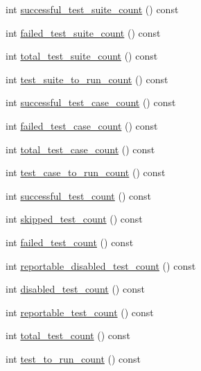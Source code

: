 \begin{DoxyCompactItemize}
\item 
int \hyperlink{classtesting_1_1UnitTest_aefa4c6654fed9a70c6c5ca61abae2234}{successful\+\_\+test\+\_\+suite\+\_\+count} () const
\item 
int \hyperlink{classtesting_1_1UnitTest_a118a74c8cc3845653893ed17245f44ac}{failed\+\_\+test\+\_\+suite\+\_\+count} () const
\item 
int \hyperlink{classtesting_1_1UnitTest_af8ed6d43a95405a860fdd898bf0c1a87}{total\+\_\+test\+\_\+suite\+\_\+count} () const
\item 
int \hyperlink{classtesting_1_1UnitTest_ade4726c8283513bd2b3391c600503790}{test\+\_\+suite\+\_\+to\+\_\+run\+\_\+count} () const
\item 
int \hyperlink{classtesting_1_1UnitTest_acaa2ab71f53c25ffe0242a91c14e173f}{successful\+\_\+test\+\_\+case\+\_\+count} () const
\item 
int \hyperlink{classtesting_1_1UnitTest_abc0fa297a4103f7cdd9627ae27d9d0ef}{failed\+\_\+test\+\_\+case\+\_\+count} () const
\item 
int \hyperlink{classtesting_1_1UnitTest_a93fc8f4eebc3212d06468ad216830ced}{total\+\_\+test\+\_\+case\+\_\+count} () const
\item 
int \hyperlink{classtesting_1_1UnitTest_a965248fbe72f9fede5de921b6666943b}{test\+\_\+case\+\_\+to\+\_\+run\+\_\+count} () const
\item 
int \hyperlink{classtesting_1_1UnitTest_a49ee8056e357ad497e67399447dd5a40}{successful\+\_\+test\+\_\+count} () const
\item 
int \hyperlink{classtesting_1_1UnitTest_a0082c74809be04baf7e43842ddac4ae5}{skipped\+\_\+test\+\_\+count} () const
\item 
int \hyperlink{classtesting_1_1UnitTest_ace1c860482b4ae5c341df5a9665e5c08}{failed\+\_\+test\+\_\+count} () const
\item 
int \hyperlink{classtesting_1_1UnitTest_a2a2835db178d5c8569507db9f0a3d54f}{reportable\+\_\+disabled\+\_\+test\+\_\+count} () const
\item 
int \hyperlink{classtesting_1_1UnitTest_ad69ccf3d4a9bc7333badeafbde3bc76b}{disabled\+\_\+test\+\_\+count} () const
\item 
int \hyperlink{classtesting_1_1UnitTest_a449d0e0350ef146040cd37679c005248}{reportable\+\_\+test\+\_\+count} () const
\item 
int \hyperlink{classtesting_1_1UnitTest_af6e02fcf76fd7247687f4e8af6e7ef41}{total\+\_\+test\+\_\+count} () const
\item 
int \hyperlink{classtesting_1_1UnitTest_a461f46b2976f135d2a65e8d3def746e9}{test\+\_\+to\+\_\+run\+\_\+count} () const

\end{DoxyCompactItemize}
